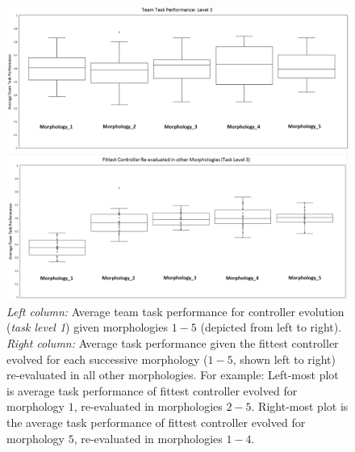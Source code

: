\documentclass[conference]{IEEEtran}
\begin{document}
\begin{figure}[t]
	\begin{minipage}{0.5\textwidth}
		\includegraphics[width=\textwidth]{Evo_BoxPlot_Level3.eps}
	\end{minipage}
	\begin{minipage}{0.5\textwidth}
		\includegraphics[width=\textwidth]{Level3_ReEval.eps}
	\end{minipage}
\caption{\textit{Left column:} Average team task performance for controller evolution (\textit{task level 1})
given morphologies $1-5$ (depicted from left to right).
\textit{Right column:} Average task performance given the fittest controller evolved
for each successive morphology ($1-5$, shown left to right) re-evaluated in all other morphologies.
For example: Left-most plot is average task performance of fittest controller evolved for
morphology $1$, re-evaluated in morphologies $2-5$.  Right-most plot is the average task performance
of fittest controller evolved for morphology $5$, re-evaluated in morphologies $1-4$.}\label{fig:level3results}
\end{figure}

\end{document}
